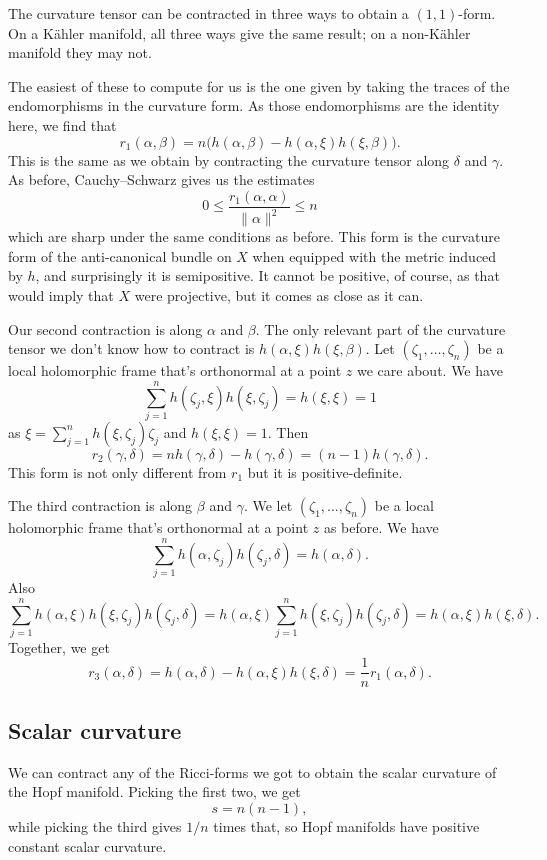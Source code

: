 \documentclass[10pt,a4paper]{article}
\begin{document}
The curvature tensor can be contracted in three ways to obtain a \((1,1)\)-form. On a K\"ahler manifold, all three ways give the same result; on a non-K\"ahler manifold they may not.

The easiest of these to compute for us is the one given by taking the traces of the endomorphisms in the curvature form. As those endomorphisms are the identity here, we find that
$$
r_1(\alpha, \beta)
= n \bigl( h(\alpha, \beta) - h(\alpha, \xi) h(\xi, \beta) \bigr).
$$
This is the same as we obtain by contracting the curvature tensor along \(\delta\) and \(\gamma\). As before, Cauchy--Schwarz gives us the estimates
$$
0
\leq \frac{r_1(\alpha, \alpha)}{\|\alpha\|^2}
\leq n
$$
which are sharp under the same conditions as before. This form is the curvature form of the anti-canonical bundle on $X$ when equipped with the metric induced by $h$, and surprisingly it is semipositive. It cannot be positive, of course, as that would imply that $X$ were projective, but it comes as close as it can.

Our second contraction is along \(\alpha\) and \(\beta\). The only relevant part of the curvature tensor we don't know how to contract is \(h(\alpha, \xi)h(\xi, \beta)\). Let \((\zeta_1, \ldots, \zeta_n)\) be a local holomorphic frame that's orthonormal at a point \(z\) we care about. We have
$$
\sum_{j=1}^n h(\zeta_j, \xi) h(\xi, \zeta_j) = h(\xi, \xi) = 1
$$
as \(\xi = \sum_{j=1}^n h(\xi, \zeta_j) \zeta_j\) and \(h(\xi,\xi) = 1\).
Then
$$
r_2(\gamma, \delta)
= n h(\gamma, \delta) - h(\gamma, \delta)
= (n-1) h(\gamma, \delta).
$$
This form is not only different from \(r_1\) but it is positive-definite.

The third contraction is along \(\beta\) and \(\gamma\). We let \((\zeta_1, \ldots, \zeta_n)\) be a local holomorphic frame that's orthonormal at a point \(z\) as before. We have
$$
\sum_{j=1}^n h(\alpha, \zeta_j) h(\zeta_j, \delta)
= h(\alpha, \delta).
$$
Also
$$
\sum_{j=1}^n h(\alpha, \xi) h(\xi, \zeta_j) h(\zeta_j, \delta)
= h(\alpha, \xi) \sum_{j=1}^n  h(\xi, \zeta_j) h(\zeta_j, \delta)
= h(\alpha, \xi) h(\xi, \delta).
$$
Together, we get
$$
r_3(\alpha, \delta)
= h(\alpha, \delta) - h(\alpha, \xi) h(\xi, \delta)
= \frac{1}{n} r_1(\alpha, \delta).
$$

\subsection{Scalar curvature}
\label{sec:orgf9212d2}

We can contract any of the Ricci-forms we got to obtain the scalar curvature of the Hopf manifold. Picking the first two, we get
$$
s = n(n-1),
$$
while picking the third gives \(1/n\) times that, so Hopf manifolds have positive constant scalar curvature.
\end{document}
